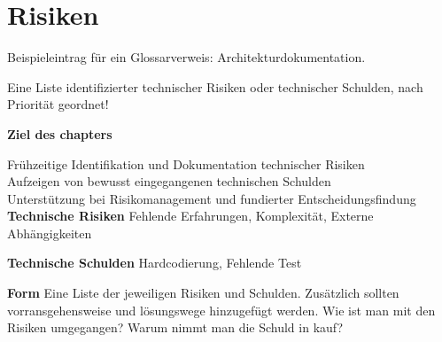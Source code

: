 \chapter{Risiken}

Beispieleintrag für ein Glossarverweis: \gls{Architekturdokumentation}.

Eine Liste identifizierter technischer Risiken oder technischer Schulden, nach Priorität geordnet!


\textbf{Ziel des chapters}

Frühzeitige Identifikation und Dokumentation technischer Risiken\\
Aufzeigen von bewusst eingegangenen technischen Schulden\\
Unterstützung bei Risikomanagement und fundierter Entscheidungsfindung\\



\textbf{Technische Risiken}
Fehlende Erfahrungen,
Komplexität,
Externe Abhängigkeiten



\textbf{Technische Schulden}
Hardcodierung,
Fehlende Test



\textbf{Form}
Eine Liste der jeweiligen Risiken und Schulden. 
Zusätzlich sollten vorransgehensweise und lösungswege hinzugefügt werden.
Wie ist man mit den Risiken umgegangen?
Warum nimmt man die Schuld in kauf?
